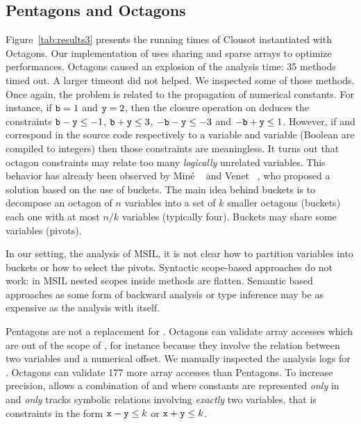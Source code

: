 \documentclass{elsart}
\begin{document}
\subsection{Pentagons and Octagons}

Figure~\ref{tab:results3} presents the running times of Clousot instantiated with Octagons.
Our implementation of \Octagons{} uses sharing and sparse arrays to optimize performances.
Octagons caused an explosion of the analysis time: 35 methods timed out.
A larger timeout did not helped.
We inspected some of those methods. 
Once again, the problem is related to the propagation of numerical constants.
For instance, if $\mathtt{b} = 1$ and $\mathtt{y} = 2$, then the closure operation on \Octagons{} deduces the constraints $\mathtt{b} - \mathtt{y} \leq -1$, $\mathtt{b} + \mathtt{y} \leq 3$, $-\mathtt{b} -\mathtt{y} \leq -3$ and $-\mathtt{b} +\mathtt{y} \leq 1$.
However, if  and  correspond in the source code respectively to a  variable and  variable  (Boolean are compiled to integers) then those constraints are meaningless.
It turns out that octagon constraints may relate too many \emph{logically} unrelated variables.
This behavior has already been observed by Min\'e ~\cite{Mine04} and Venet ~\cite{Venet04}, who proposed a solution based on the use of buckets.
The main idea behind buckets is to decompose an octagon of $n$ variables into a set of $k$ smaller octagons (buckets) each one with at most $n/k$ variables (typically four). 
Buckets may share some variables (pivots). 

In our setting, \ie{}   the analysis of MSIL, it is not clear how to partition variables into buckets or how to select the pivots.
Syntactic scope-based approaches do not work: in MSIL nested scopes inside methods are flatten.
Semantic based approaches as some form of backward analysis or type inference may be as expensive as the analysis with \Pentagons{} itself.

Pentagons are not a replacement for \Octagons{}. Octagons can validate
array accesses which are out of the scope of \Pentagons{}, for
instance because they involve the relation between two variables and a
numerical offset. 
We manually inspected the analysis logs for .
Octagons can validate 177 more array accesses than Pentagons. 
To increase precision, \Clousot{} allows a combination of \Pentagons{} and
\Octagons{} where constants are represented \emph{only} in
\Pentagons{} and \Octagons{} \emph{only} tracks  symbolic relations
involving \emph{exactly} two variables, that is constraints in the
form $\mathtt{x} - \mathtt{y} \leq k$ or $\mathtt{x} + \mathtt{y} \leq k$. 
\end{document}
